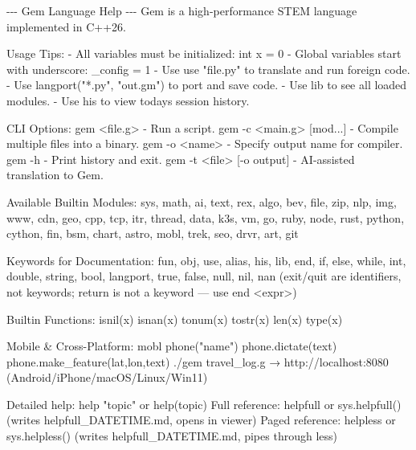 \documentclass[
]{article}
\newenvironment{Shaded}{}{}
\newcommand{\NormalTok}[1]{#1}
\begin{document}
\begin{Shaded}
\begin{Highlighting}[]
\NormalTok{{-}{-}{-} Gem Language Help {-}{-}{-}}
\NormalTok{Gem is a high{-}performance STEM language implemented in C++26.}

\NormalTok{Usage Tips:}
\NormalTok{  {-} All variables must be initialized: \textquotesingle{}int x = 0\textquotesingle{}}
\NormalTok{  {-} Global variables start with underscore: \textquotesingle{}\_config = 1\textquotesingle{}}
\NormalTok{  {-} Use \textquotesingle{}use "file.py"\textquotesingle{} to translate and run foreign code.}
\NormalTok{  {-} Use \textquotesingle{}langport("*.py", "out.gm")\textquotesingle{} to port and save code.}
\NormalTok{  {-} Use \textquotesingle{}lib\textquotesingle{} to see all loaded modules.}
\NormalTok{  {-} Use \textquotesingle{}his\textquotesingle{} to view today\textquotesingle{}s session history.}

\NormalTok{CLI Options:}
\NormalTok{  gem \textless{}file.g\textgreater{}              {-} Run a script.}
\NormalTok{  gem {-}c \textless{}main.g\textgreater{} [mod...]  {-} Compile multiple files into a binary.}
\NormalTok{  gem {-}o \textless{}name\textgreater{}             {-} Specify output name for compiler.}
\NormalTok{  gem {-}h                    {-} Print history and exit.}
\NormalTok{  gem {-}t \textless{}file\textgreater{} [{-}o output] {-} AI{-}assisted translation to Gem.}

\NormalTok{Available Builtin Modules:}
\NormalTok{  sys, math, ai, text, rex, algo, bev, file, zip, nlp, img, www, cdn, geo,}
\NormalTok{  cpp, tcp, itr, thread, data, k3s, vm, go, ruby, node, rust,}
\NormalTok{  python, cython,}
\NormalTok{  fin, bsm, chart, astro, mobl, trek, seo, drvr, art,}
\NormalTok{  git}

\NormalTok{Keywords for Documentation:}
\NormalTok{  fun, obj, use, alias, his, lib, end, if, else, while,}
\NormalTok{  int, double, string, bool, langport,}
\NormalTok{  true, false, null, nil, nan}
\NormalTok{  (exit/quit are identifiers, not keywords; \textquotesingle{}return\textquotesingle{} is not a keyword — use \textquotesingle{}end \textless{}expr\textgreater{}\textquotesingle{})}

\NormalTok{Builtin Functions:}
\NormalTok{  isnil(x)  isnan(x)  tonum(x)  tostr(x)  len(x)  type(x)}

\NormalTok{Mobile \& Cross{-}Platform:}
\NormalTok{  mobl phone("name")  phone.dictate(text)  phone.make\_feature(lat,lon,text)}
\NormalTok{  ./gem travel\_log.g  →  http://localhost:8080  (Android/iPhone/macOS/Linux/Win11)}

\NormalTok{Detailed help: help "topic"  or  help(topic)}
\NormalTok{Full reference: helpfull  or  sys.helpfull()  (writes helpfull\_DATETIME.md, opens in viewer)}
\NormalTok{Paged reference: helpless  or  sys.helpless()  (writes helpfull\_DATETIME.md, pipes through less)}
\end{Highlighting}
\end{Shaded}
\end{document}
